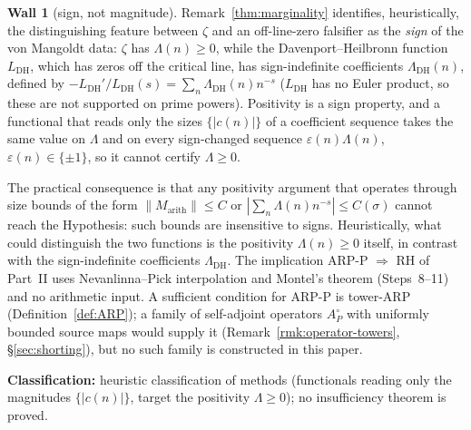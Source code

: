 \documentclass[11pt]{amsart}
\theoremstyle{definition}
\theoremstyle{remark}
\theoremstyle{definition}
\newtheorem{obstruction}{Wall}[section]
\begin{document}
\begin{obstruction}[sign, not magnitude]\label{ob:magphase}
Remark~\ref{thm:marginality} identifies, heuristically, the distinguishing feature between $\zeta$ and an
off-line-zero falsifier as the \emph{sign} of the von Mangoldt data: $\zeta$ has $\Lambda(n)\ge0$, while
the Davenport--Heilbronn function $L_{\mathrm{DH}}$, which has zeros off the critical line, has
sign-indefinite coefficients $\Lambda_{\mathrm{DH}}(n)$, defined by
$-L_{\mathrm{DH}}'/L_{\mathrm{DH}}(s)=\sum_n\Lambda_{\mathrm{DH}}(n)n^{-s}$ ($L_{\mathrm{DH}}$ has no Euler
product, so these are not supported on prime powers). Positivity is a sign
property, and a functional that reads only the sizes $\{|c(n)|\}$ of a coefficient sequence takes the
same value on $\Lambda$ and on every sign-changed sequence $\varepsilon(n)\Lambda(n)$, $\varepsilon(n)\in\{\pm1\}$,
so it cannot certify $\Lambda\ge0$.

The practical consequence is that any positivity argument that operates through size bounds of the form
$\|M_{\mathrm{arith}}\|\le C$ or $|\sum_n\Lambda(n)n^{-s}|\le C(\sigma)$ cannot reach the Hypothesis: such
bounds are insensitive to signs. Heuristically, what could distinguish the two functions is the
positivity $\Lambda(n)\ge0$ itself, in contrast with the sign-indefinite coefficients
$\Lambda_{\mathrm{DH}}$. The implication ARP-P $\Rightarrow$ RH of Part~II uses Nevanlinna--Pick
interpolation and Montel's theorem (Steps~8--11) and no arithmetic input. A sufficient condition for
ARP-P is tower-ARP (Definition~\ref{def:ARP}); a family of self-adjoint operators $A_P^\circ$ with
uniformly bounded source maps would supply it (Remark~\ref{rmk:operator-towers}, \S\ref{sec:shorting}),
but no such family is constructed in this paper.

\smallskip\noindent\textbf{Classification:} heuristic classification of methods (functionals reading only
the magnitudes $\{|c(n)|\}$, target the positivity $\Lambda\ge0$); no insufficiency theorem is
proved.
\end{obstruction}
\end{document}
